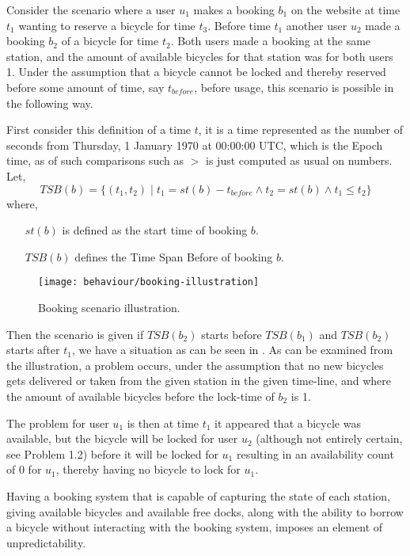 \begin{description}[style=nextline]
\item[Problem 1.1] Consider the scenario where a user $u_1$ makes a booking $b_1$ on the website at time $t_1$ wanting to reserve a bicycle for time $t_3$. Before time $t_1$ another user $u_2$ made a booking $b_2$ of a bicycle for time $t_2$. Both users made a booking at the same station, and the amount of available bicycles for that station was for both users 1. Under the assumption that a bicycle cannot be locked and thereby reserved before some amount of time, say $t_{before}$, before usage, this scenario is possible in the following way.

First consider this definition of a time $t$, it is a time represented as the number of seconds from Thursday, 1 January 1970 at 00:00:00 UTC, which is the Epoch time, as of such comparisons such as $>$ is just computed as usual on numbers.
Let, 
$$TSB(b) = \{(t_1,t_2) \;| \;t_1 = st(b) - t_{before} \land t_2 = st(b) \land t_1 \leq t_2 \}$$
where,
\begin{itemize}[align = left]
	\item[$st(b)$] is defined as the start time of booking $b$.
	\item[$TSB(b)$] defines the Time Span Before of booking $b$.
\end{itemize} 

\begin{figure}[h]
	\centering
	\texttt{[image: behaviour/booking-illustration]}
	\caption{Booking scenario illustration.}\label{fig:booking-illustartion}
\end{figure}
Then the scenario is given if $TSB(b_2)$ starts before $TSB(b_1)$ and $TSB(b_2)$ starts after $t_1$, we have a situation as can be seen in .
As can be examined from the illustration, a problem occurs, under the assumption that no new bicycles gets delivered or taken from the given station in the given time-line, and where the amount of available bicycles before the lock-time of $b_2$ is 1.

The problem for user $u_1$ is then at time $t_1$ it appeared that a bicycle was available, but the bicycle will be locked for user $u_2$ (although not entirely certain, see Problem 1.2) before it will be locked for $u_1$ resulting in an availability count of 0 for $u_1$, thereby having no bicycle to lock for $u_1$.

\item[Problem 1.2] Having a booking system that is capable of capturing the state of each station, giving available bicycles and available free docks, along with the ability to borrow a bicycle without interacting with the booking system, imposes an element of unpredictability.


\end{description}
